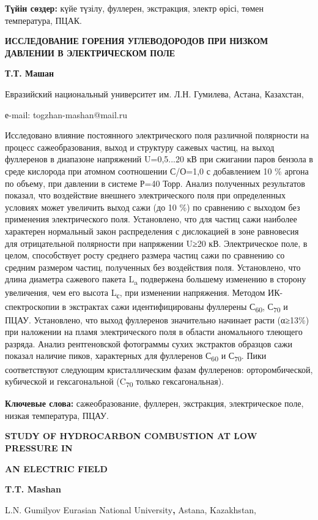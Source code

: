 {\bfseries Түйін сөздер:} күйе түзілу, фуллерен, экстракция, электр өрісі,
төмен температура, ПЦАК.

{\bfseries ИССЛЕДОВАНИЕ ГОРЕНИЯ УГЛЕВОДОРОДОВ ПРИ НИЗКОМ ДАВЛЕНИИ В
ЭЛЕКТРИЧЕСКОМ ПОЛЕ}

{\bfseries Т.Т. Машан}

Евразийский национальный университет им. Л.Н. Гумилева, Астана,
Казахстан,

е-mail: togzhan-mashan@mail.ru

Исследовано влияние постоянного электрического поля различной полярности
на процесс сажеобразования, выход и структуру сажевых частиц, на выход
фуллеренов в диапазоне напряжений U=0,5...20 кВ при сжигании паров
бензола в среде кислорода при атомном соотношении С/О=1,0 с добавлением
10 \% аргона по объему, при давлении в системе Р=40 Торр. Анализ
полученных результатов показал, что воздействие внешнего электрического
поля при определенных условиях может увеличить выход сажи (до 10 \%) по
сравнению с выходом без применения электрического поля. Установлено, что
для частиц сажи наиболее характерен нормальный закон распределения с
дислокацией в зоне равновесия для отрицательной полярности при
напряжении U≥20 кВ. Электрическое поле, в целом, способствует росту
среднего размера частиц сажи по сравнению со средним размером частиц,
полученных без воздействия поля. Установлено, что длина диаметра
сажевого пакета L\textsubscript{a} подвержена большему изменению в
сторону увеличения, чем его высота L\textsubscript{с}, при изменении
напряжения. Методом ИК-спектроскопии в экстрактах сажи идентифицированы
фуллерены С\textsubscript{60}, С\textsubscript{70} и ПЦАУ. Установлено,
что выход фуллеренов значительно начинает расти (α≥13\%) при наложении
на пламя электрического поля в области аномального тлеющего разряда.
Анализ рентгеновской фотограммы сухих экстрактов образцов сажи показал
наличие пиков, характерных для фуллеренов С\textsubscript{60} и
С\textsubscript{70}. Пики соответствуют следующим кристаллическим фазам
фуллеренов: орторомбической, кубической и гексагональной
(C\textsubscript{70} только гексагональная).

{\bfseries Ключевые слова:} сажеобразование, фуллерен, экстракция,
электрическое поле, низкая температура, ПЦАУ.

{\bfseries STUDY OF HYDROCARBON COMBUSTION AT LOW PRESSURE IN}

{\bfseries AN ELECTRIC FIELD}

{\bfseries T.T. Mashan}

L.N. Gumilyov Eurasian National University{\bfseries ,} Astana, Kazakhstan,

